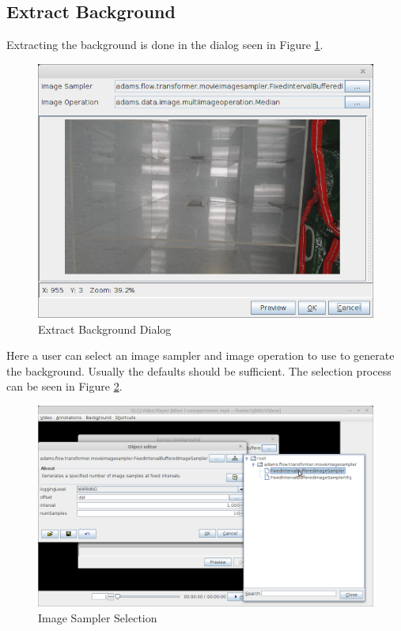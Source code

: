 \documentclass[a4paper]{book}
\begin{document}
\subsection{Extract Background}
Extracting the background is done in the dialog seen in Figure \ref{AnnotatorExtractBackground}.

\begin{figure}[htb]
  \centering
  \includegraphics[width=12.0cm]{images/AnnotatorExtractBackground.png}
  \caption{Extract Background Dialog}
  \label{AnnotatorExtractBackground}
\end{figure}

Here a user can select an image sampler and image operation to use to generate the background. Usually the defaults
should be sufficient. The selection process can be seen in Figure \ref{AnnotatorSamplerSelection}.

\begin{figure}[htb]
  \centering
  \includegraphics[width=12.0cm]{images/AnnotatorBackgroundExtractionSamplerSelection.png}
  \caption{Image Sampler Selection}
  \label{AnnotatorSamplerSelection}
\end{figure}
\end{document}
